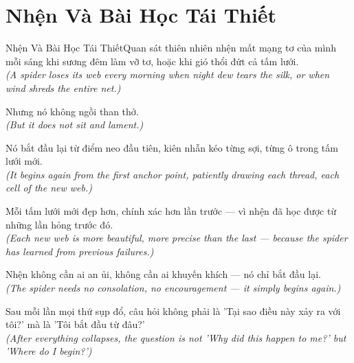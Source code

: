 \section{Nhện Và Bài Học Tái Thiết}
\begin{truyen}{Nhện Và Bài Học Tái Thiết}{Quan sát thiên nhiên}
 nhện mất mạng tơ của mình mỗi sáng khi sương đêm làm vỡ tơ, hoặc khi gió thổi đứt cả tấm lưới.\\[4pt]
\textit{(A spider loses its web every morning when night dew tears the silk, or when wind shreds the entire net.)}

Nhưng nó không ngồi than thở.\\[4pt]
\textit{(But it does not sit and lament.)}

Nó bắt đầu lại từ điểm neo đầu tiên, kiên nhẫn kéo từng sợi, từng ô trong tấm lưới mới.\\[4pt]
\textit{(It begins again from the first anchor point, patiently drawing each thread, each cell of the new web.)}

Mỗi tấm lưới mới đẹp hơn, chính xác hơn lần trước --- vì nhện đã học được từ những lần hỏng trước đó.\\[4pt]
\textit{(Each new web is more beautiful, more precise than the last --- because the spider has learned from previous failures.)}

Nhện không cần ai an ủi, không cần ai khuyến khích --- nó chỉ bắt đầu lại.\\[4pt]
\textit{(The spider needs no consolation, no encouragement --- it simply begins again.)}

\end{truyen}
\begin{baihoc}
  Sau mỗi lần mọi thứ sụp đổ, câu hỏi không phải là 'Tại sao điều này xảy ra với tôi?' mà là 'Tôi bắt đầu từ đâu?'\\[4pt]
  \textit{(After everything collapses, the question is not 'Why did this happen to me?' but 'Where do I begin?')}
\end{baihoc}

